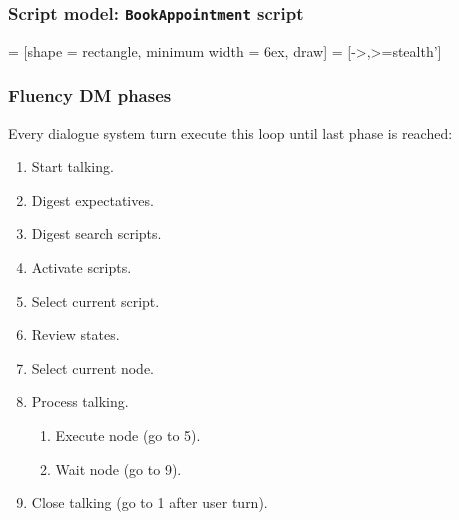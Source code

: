 \documentclass[11pt]{beamer}
\begin{document}
\begin{frame}[fragile]
\frametitle{Script model: \texttt{BookAppointment} script}
\scriptsize
{} = [shape            = rectangle,
                           minimum width    = 6ex,%
                           draw]
   = [->,>=stealth']      
\begin{center}
\end{center}
\end{frame}

\begin{frame}[fragile]
\frametitle{Fluency DM phases}
Every dialogue system turn execute this loop until last phase is reached:
\begin{enumerate}
	\item Start talking.
	\item Digest expectatives.
	\item Digest search scripts.
	\item Activate scripts.
	\item Select current script.
	\item Review states.
	\item Select current node.
	\item Process talking.
	\begin{enumerate}
		\item Execute node (go to 5).
		\item Wait node (go to 9).
	\end{enumerate}
	\item Close talking (go to 1 after user turn).
\end{enumerate}
\end{frame}
\end{document}
